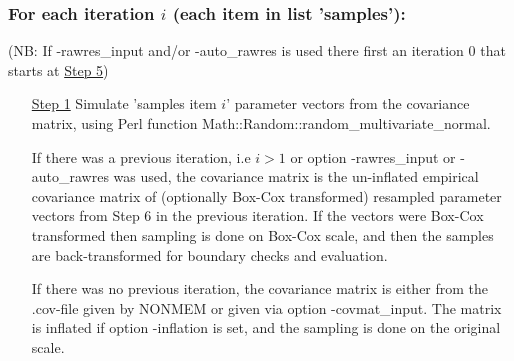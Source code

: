 \subsubsection*{For each iteration $i$ (each item in list 'samples'):}
(NB: If -rawres\_input and/or -auto\_rawres is used there first an iteration 0 that starts at \underline{Step 5})
\begin{itemize}
\item[\underline{Step 1}] 
Simulate 'samples item $i$' parameter vectors from the 
covariance matrix, using Perl function Math::Random::random\_multivariate\_normal.

\noindent If there was a previous iteration, i.e $i>1$ or option -rawres\_input or -auto\_rawres was used, 
the covariance matrix is the un-inflated
empirical covariance matrix of (optionally Box-Cox transformed) resampled parameter vectors from
Step 6 in the previous iteration. If the vectors were Box-Cox transformed then
sampling is done on Box-Cox scale, and 
then the samples are back-transformed for boundary checks and evaluation.

\noindent If there was no previous iteration, the covariance matrix is either from
the .cov-file given by NONMEM or given via option -covmat\_input.
The matrix is inflated if option -inflation is set, and the sampling is done on the original scale. 


\end{itemize}
